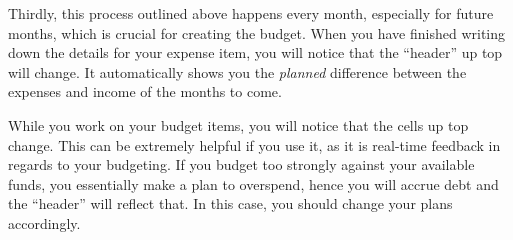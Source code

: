 Thirdly, this process outlined above happens every month, especially for future months, which is crucial for creating the budget.
When you have finished writing down the details for your expense item, you will notice that the ``header'' up top will change.
It automatically shows you the \emph{planned} difference between the expenses and income of the months to come.
\begin{specialnote}
	While you work on your budget items, you will notice that the cells up top change.
	This can be extremely helpful if you use it, as it is real-time feedback in regards to your budgeting.
	If you budget too strongly against your available funds, you essentially make a plan to overspend, hence you will accrue debt and the ``header'' will reflect that.
	In this case, you should change your plans accordingly.
\end{specialnote}

